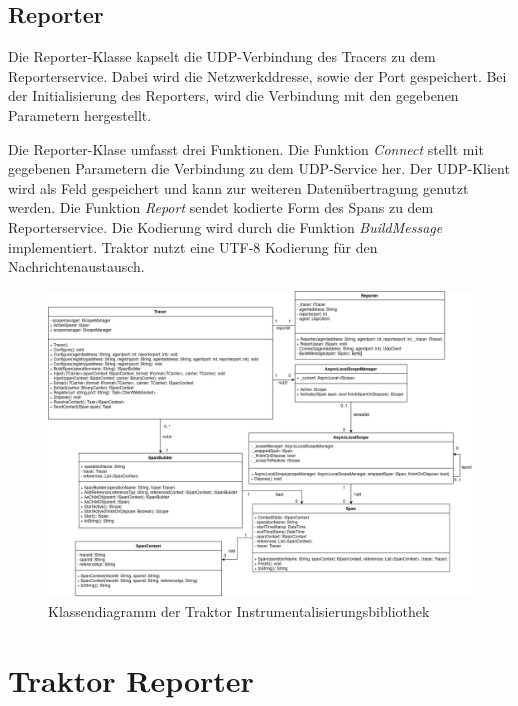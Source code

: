 \subsection{Reporter}
\label{subsection:Reporter}
Die Reporter-Klasse kapselt die UDP-Verbindung des Tracers zu dem Reporterservice. Dabei wird die Netzwerkddresse, sowie der Port gespeichert. Bei der Initialisierung des Reporters, wird die Verbindung mit den gegebenen Parametern hergestellt.

Die Reporter-Klase umfasst drei Funktionen. Die Funktion \emph{Connect} stellt mit gegebenen Parametern die Verbindung zu dem UDP-Service her. Der UDP-Klient wird als Feld gespeichert und kann zur weiteren Datenübertragung genutzt werden. Die Funktion \emph{Report} sendet kodierte Form des Spans zu dem Reporterservice. Die Kodierung wird durch die Funktion \emph{BuildMessage} implementiert. Traktor nutzt eine UTF-8 Kodierung für den Nachrichtenaustausch.

\newpage
\begin{landscape}
	\begin{figure}
		\centering
		\includegraphics[scale=0.4]{img/Implementierung/TraktorKlassendiagramm.png}
		\caption[Klassendiagramm der Traktor Instrumentalisierungsbibliothek]{Klassendiagramm der Traktor Instrumentalisierungsbibliothek}
		\label{fig:TraktorKlassendiagramm}
	\end{figure}
\end{landscape}

\section{Traktor Reporter}
\label{section:Traktor Reporter}

